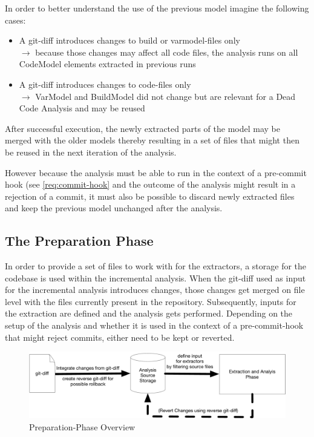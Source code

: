 \documentclass[a4paper]{article}
\begin{document}
In order to better understand the use of the previous model imagine the following cases:

\begin{itemize}
	\item A git-diff introduces changes to build or varmodel-files only \\
	$\rightarrow$ because those changes may affect all code files, the analysis runs on all CodeModel elements extracted in previous runs
	\item A git-diff introduces changes to code-files only \\
	$\rightarrow$ VarModel and BuildModel did not change but are relevant for a Dead Code Analysis and may be reused
\end{itemize}

After successful execution, the newly extracted parts of the model may be merged with the older models thereby resulting in a set of files that might then be reused in the next iteration of the analysis.

However because the analysis must be able to run in the context of a pre-commit hook (see \ref{req:commit-hook} and the outcome of the analysis might result in a rejection of a commit, it must also be possible to discard newly extracted files and keep the previous model unchanged after the analysis.

\subsection{The Preparation Phase}

In order to provide a set of files to work with for the extractors, a storage for the codebase is used within the incremental analysis. When the git-diff used as input for the incremental analysis introduces changes, those changes get merged on file level with the files currently present in the repository. Subsequently, inputs for the extraction are defined and the analysis gets performed. Depending on the setup of the analysis and whether it is used in the context of a pre-commit-hook that might reject commits, either need to be kept or reverted.

\begin{figure}[htbp] 
  \centering
  \begin{minipage}[b]{1\textwidth} 
    \caption[Preparation-Phase Overview]{Preparation-Phase Overview}\label{fig:preparation-overview}
    \includegraphics[width=1\textwidth]{img/PreparationOverview.pdf}
  \end{minipage}
\end{figure}
\end{document}
